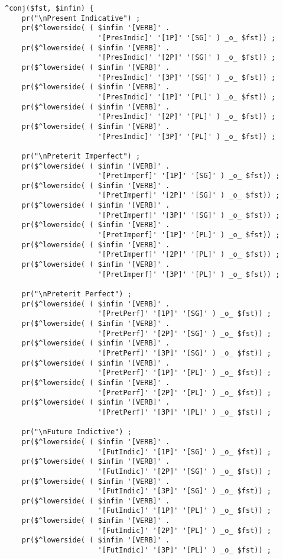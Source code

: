\begin{Verbatim}
^conj($fst, $infin) {
    pr("\nPresent Indicative") ;
    pr($^lowerside( ( $infin '[VERB]' . 
                      '[PresIndic]' '[1P]' '[SG]' ) _o_ $fst)) ;
    pr($^lowerside( ( $infin '[VERB]' . 
                      '[PresIndic]' '[2P]' '[SG]' ) _o_ $fst)) ;
    pr($^lowerside( ( $infin '[VERB]' . 
                      '[PresIndic]' '[3P]' '[SG]' ) _o_ $fst)) ;
    pr($^lowerside( ( $infin '[VERB]' . 
                      '[PresIndic]' '[1P]' '[PL]' ) _o_ $fst)) ;
    pr($^lowerside( ( $infin '[VERB]' . 
                      '[PresIndic]' '[2P]' '[PL]' ) _o_ $fst)) ;
    pr($^lowerside( ( $infin '[VERB]' . 
                      '[PresIndic]' '[3P]' '[PL]' ) _o_ $fst)) ;

    pr("\nPreterit Imperfect") ;
    pr($^lowerside( ( $infin '[VERB]' . 
                      '[PretImperf]' '[1P]' '[SG]' ) _o_ $fst)) ;
    pr($^lowerside( ( $infin '[VERB]' . 
                      '[PretImperf]' '[2P]' '[SG]' ) _o_ $fst)) ;
    pr($^lowerside( ( $infin '[VERB]' . 
                      '[PretImperf]' '[3P]' '[SG]' ) _o_ $fst)) ;
    pr($^lowerside( ( $infin '[VERB]' . 
                      '[PretImperf]' '[1P]' '[PL]' ) _o_ $fst)) ;
    pr($^lowerside( ( $infin '[VERB]' . 
                      '[PretImperf]' '[2P]' '[PL]' ) _o_ $fst)) ;
    pr($^lowerside( ( $infin '[VERB]' . 
                      '[PretImperf]' '[3P]' '[PL]' ) _o_ $fst)) ;

    pr("\nPreterit Perfect") ;
    pr($^lowerside( ( $infin '[VERB]' . 
                      '[PretPerf]' '[1P]' '[SG]' ) _o_ $fst)) ;
    pr($^lowerside( ( $infin '[VERB]' . 
                      '[PretPerf]' '[2P]' '[SG]' ) _o_ $fst)) ;
    pr($^lowerside( ( $infin '[VERB]' . 
                      '[PretPerf]' '[3P]' '[SG]' ) _o_ $fst)) ;
    pr($^lowerside( ( $infin '[VERB]' . 
                      '[PretPerf]' '[1P]' '[PL]' ) _o_ $fst)) ;
    pr($^lowerside( ( $infin '[VERB]' . 
                      '[PretPerf]' '[2P]' '[PL]' ) _o_ $fst)) ;
    pr($^lowerside( ( $infin '[VERB]' . 
                      '[PretPerf]' '[3P]' '[PL]' ) _o_ $fst)) ;

    pr("\nFuture Indictive") ;
    pr($^lowerside( ( $infin '[VERB]' . 
                      '[FutIndic]' '[1P]' '[SG]' ) _o_ $fst)) ;
    pr($^lowerside( ( $infin '[VERB]' . 
                      '[FutIndic]' '[2P]' '[SG]' ) _o_ $fst)) ;
    pr($^lowerside( ( $infin '[VERB]' . 
                      '[FutIndic]' '[3P]' '[SG]' ) _o_ $fst)) ;
    pr($^lowerside( ( $infin '[VERB]' . 
                      '[FutIndic]' '[1P]' '[PL]' ) _o_ $fst)) ;
    pr($^lowerside( ( $infin '[VERB]' . 
                      '[FutIndic]' '[2P]' '[PL]' ) _o_ $fst)) ;
    pr($^lowerside( ( $infin '[VERB]' . 
                      '[FutIndic]' '[3P]' '[PL]' ) _o_ $fst)) ;


\end{Verbatim}
